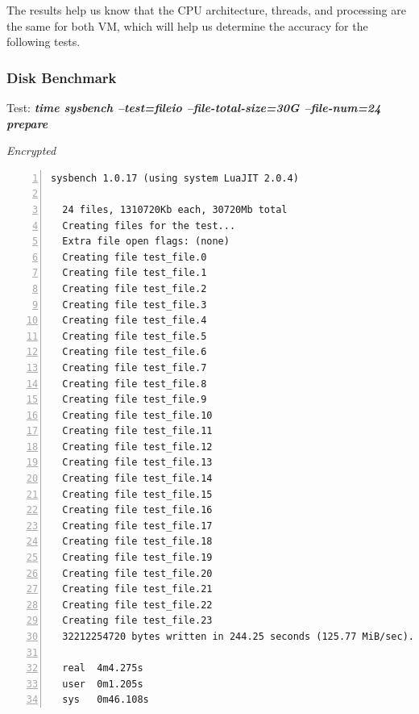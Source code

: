 The results help us know that the CPU architecture, threads, and processing are the same for both VM, which will help us determine the accuracy for the following tests.
\newpage
\subsubsection{Disk Benchmark}
\begin{center}
  Test: \textbf{\textit{time sysbench --test=fileio --file-total-size=30G --file-num=24 prepare}}  
\end{center}
\vspace*{-\baselineskip}
\noindent\begin{minipage}[t]{0.45\linewidth}
  \centering
  \textit{Encrypted}
  \lstset{language=bash,label=SliceExaple}
  \begin{lstlisting}[basicstyle=\tiny,frame=single, numbers=left, label=cpu_test1]
  sysbench 1.0.17 (using system LuaJIT 2.0.4)

  24 files, 1310720Kb each, 30720Mb total
  Creating files for the test...
  Extra file open flags: (none)
  Creating file test_file.0
  Creating file test_file.1
  Creating file test_file.2
  Creating file test_file.3
  Creating file test_file.4
  Creating file test_file.5
  Creating file test_file.6
  Creating file test_file.7
  Creating file test_file.8
  Creating file test_file.9
  Creating file test_file.10
  Creating file test_file.11
  Creating file test_file.12
  Creating file test_file.13
  Creating file test_file.14
  Creating file test_file.15
  Creating file test_file.16
  Creating file test_file.17
  Creating file test_file.18
  Creating file test_file.19
  Creating file test_file.20
  Creating file test_file.21
  Creating file test_file.22
  Creating file test_file.23
  32212254720 bytes written in 244.25 seconds (125.77 MiB/sec).
  
  real	4m4.275s
  user	0m1.205s
  sys	0m46.108s
  \end{lstlisting}
\end{minipage}
\hspace{0.5cm}
